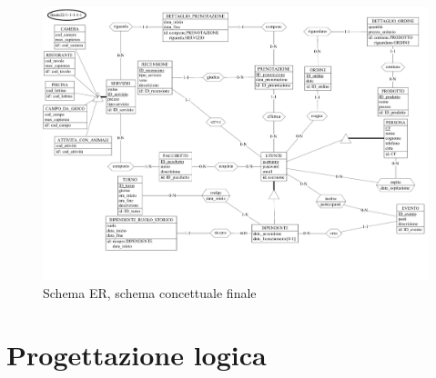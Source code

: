 \documentclass[a4paper,12pt]{report}
\begin{document}
\begin{figure}[H]
	\centering
	\includegraphics[width=\textwidth, trim=0 75pt 20pt 0, clip, angle=0]{./pdf/finale.pdf}
	\caption{Schema ER, schema concettuale finale}
	\label{fig:schema-finale}
\end{figure}
\newpage

\chapter{Progettazione logica}
\end{document}

